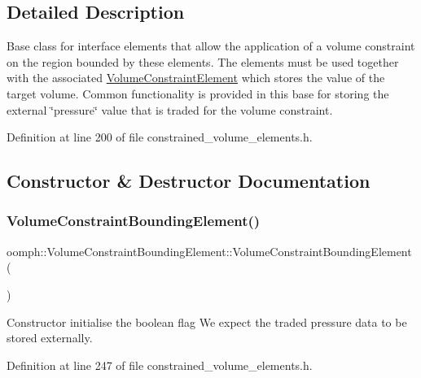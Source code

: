 \subsection{Detailed Description}
Base class for interface elements that allow the application of a volume constraint on the region bounded by these elements. The elements must be used together with the associated \hyperlink{classoomph_1_1VolumeConstraintElement}{Volume\+Constraint\+Element} which stores the value of the target volume. Common functionality is provided in this base for storing the external \char`\"{}pressure\char`\"{} value that is traded for the volume constraint. 

Definition at line 200 of file constrained\+\_\+volume\+\_\+elements.\+h.



\subsection{Constructor \& Destructor Documentation}
\mbox{\label{classoomph_1_1VolumeConstraintBoundingElement_a423139995a5543fda59d36cf230edb44}} 
\subsubsection{\texorpdfstring{Volume\+Constraint\+Bounding\+Element()}{VolumeConstraintBoundingElement()}}
{\footnotesize\ttfamily oomph\+::\+Volume\+Constraint\+Bounding\+Element\+::\+Volume\+Constraint\+Bounding\+Element (\begin{DoxyParamCaption}{ }\end{DoxyParamCaption})\hspace{0.3cm}{\ttfamily [inline]}}



Constructor initialise the boolean flag We expect the traded pressure data to be stored externally. 



Definition at line 247 of file constrained\+\_\+volume\+\_\+elements.\+h.

\mbox{\label{classoomph_1_1VolumeConstraintBoundingElement_a6a54150611ce06f05ea47ba99cf9e132}} 
